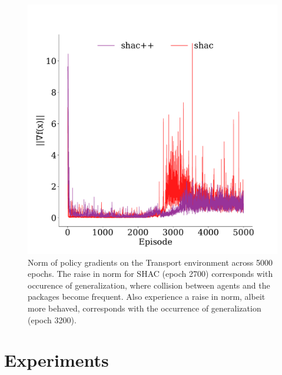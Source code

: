 \begin{figure}[t]
    \includegraphics[width=\columnwidth]{figs/grads-transformer-transport.pdf}
    \caption{Norm of policy gradients on the Transport environment across 5000 epochs. The raise in norm for SHAC (epoch 2700) corresponds with occurence of generalization, where collision between agents and the packages become frequent. Also \fname{} experience a raise in norm, albeit more behaved, corresponds with the occurrence of generalization (epoch 3200).}\label{fig:grads-transformer-transport}
\end{figure}

\section{Experiments}\label{sect:experiments}

